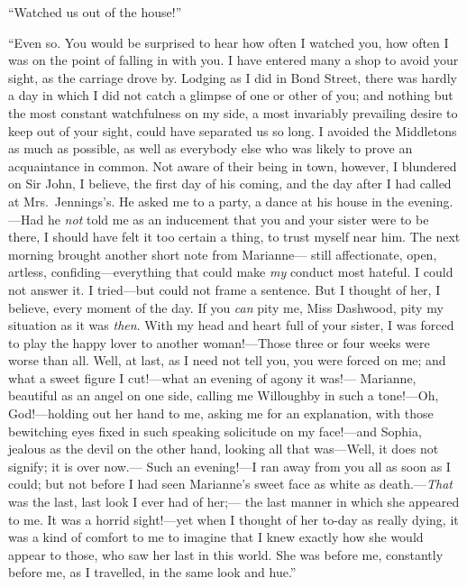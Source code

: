 ``Watched us out of the house!''

``Even so.  You would be surprised to hear how often
I watched you, how often I was on the point of falling
in with you.  I have entered many a shop to avoid your sight,
as the carriage drove by.  Lodging as I did in Bond Street,
there was hardly a day in which I did not catch a glimpse
of one or other of you; and nothing but the most constant
watchfulness on my side, a most invariably prevailing
desire to keep out of your sight, could have separated us
so long.  I avoided the Middletons as much as possible,
as well as everybody else who was likely to prove
an acquaintance in common.  Not aware of their being
in town, however, I blundered on Sir John, I believe,
the first day of his coming, and the day after I had called
at Mrs.\ Jennings's.  He asked me to a party, a dance at his
house in the evening.---Had he \emph{not} told me as an inducement
that you and your sister were to be there, I should have
felt it too certain a thing, to trust myself near him.
The next morning brought another short note from Marianne---%
still affectionate, open, artless, confiding---everything
that could make \emph{my} conduct most hateful.  I could not
answer it.  I tried---but could not frame a sentence.
But I thought of her, I believe, every moment of the day.
If you \emph{can} pity me, Miss Dashwood, pity my situation as it
was \emph{then}.  With my head and heart full of your sister,
I was forced to play the happy lover to another woman!---Those
three or four weeks were worse than all.  Well, at last,
as I need not tell you, you were forced on me; and what a
sweet figure I cut!---what an evening of agony it was!---%
Marianne, beautiful as an angel on one side, calling me
Willoughby in such a tone!---Oh, God!---holding out her hand
to me, asking me for an explanation, with those bewitching
eyes fixed in such speaking solicitude on my face!---and
Sophia, jealous as the devil on the other hand, looking
all that was---Well, it does not signify; it is over now.---%
Such an evening!---I ran away from you all as soon as I could;
but not before I had seen Marianne's sweet face as white
as death.---\emph{That} was the last, last look I ever had of her;---%
the last manner in which she appeared to me.  It was a horrid
sight!---yet when I thought of her to-day as really dying,
it was a kind of comfort to me to imagine that I knew
exactly how she would appear to those, who saw her last
in this world.  She was before me, constantly before me,
as I travelled, in the same look and hue.''

